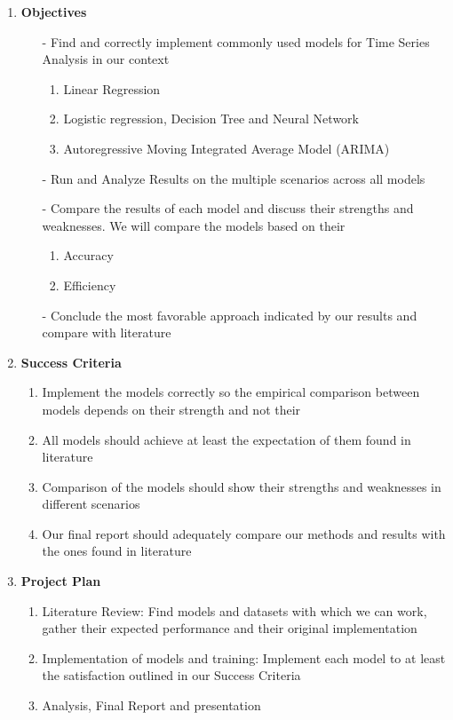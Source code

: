 \documentclass[12pt, letterpaper]{article}
\begin{document}
\begin{enumerate}[label=]
    \item \textbf{Objectives }
        \begin{itemize}
            \item[-] Find and correctly implement commonly used models for Time Series Analysis in our context
              \begin{enumerate}[label=\alph*.]
              \item Linear Regression
              \item Logistic regression, Decision Tree and Neural Network
              \item Autoregressive Moving Integrated Average Model (ARIMA)
              \end{enumerate}
            \item[-] Run and Analyze Results on the multiple scenarios across all models
            \item[-] Compare the results of each model and discuss their strengths and weaknesses. We will compare the models based on their
              \begin{enumerate}[label=\alph*.]
                \item Accuracy
                \item Efficiency
              \end{enumerate}
            \item[-] Conclude the most favorable approach indicated by our results and compare with literature
        \end{itemize} 
    \item \textbf{Success Criteria}
        \begin{enumerate}[label=-]
            \item Implement the models correctly so the empirical comparison between models depends on their strength and not their
            \item All models should achieve at least the expectation of them found in literature
            \item Comparison of the models should show their strengths and weaknesses in different scenarios
            \item Our final report should adequately compare our methods and results with the ones found in literature
        \end{enumerate} 
        
    \item \textbf{Project Plan} %
        \begin{enumerate}[label=-]
            \item Literature Review: Find models and datasets with which we can work, gather their expected performance and their original implementation
            \item Implementation of models and training: Implement each model to at least the satisfaction outlined in our Success Criteria
            \item Analysis, Final Report and presentation
        \end{enumerate}
    

\end{enumerate}
\end{document}
